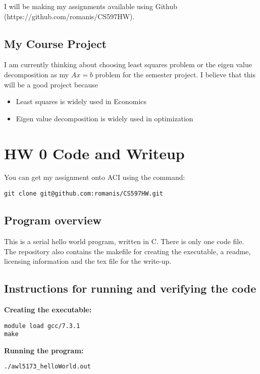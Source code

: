\documentclass{article}
\begin{document}
\begin{spacing}{1.1}
I will be making my assignments available using Github (https://github.com/romanis/CS597HW). 

\subsection{My Course Project}

I am currently thinking about choosing least squares problem or the eigen value decomposition as my $Ax=b$ problem for the semester project. I believe that this will be a good project because
\begin{itemize}
  \item Least squares is widely used in Economics
  \item Eigen value decomposition is widely used in optimization
\end{itemize}


\section{HW 0 Code and Writeup}

You can get my assignment onto ACI using the command:

\begin{verbatim}
git clone git@github.com:romanis/CS597HW.git
\end{verbatim}



\subsection{Program overview}

This is a serial hello world program, written in C. There is only one code file. The repository also contains the makefile for creating the executable, a readme, licensing information and the tex file for the write-up.


\subsection{Instructions for running and verifying the code}

\textbf{Creating the executable:}
\begin{verbatim}
module load gcc/7.3.1
make
\end{verbatim}

\textbf{Running the program:}
\begin{verbatim}
./awl5173_helloWorld.out
\end{verbatim}


\end{spacing}
\end{document}
